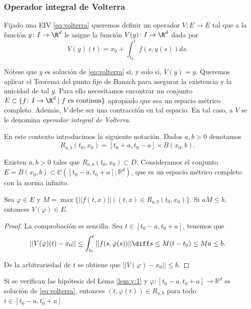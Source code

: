 \documentclass{article}
\begin{document}
\subsubsection{Operador integral de Volterra} \label{sec:eu:pl:volterra}

Fijado una EIV \eqref{eq:volterra} queremos definir un operador $V \colon E \to E$ tal que a la
función $y\colon I \to \R^d$ le asigne la función $V(y)\colon I \to \R^d$ dada por
\begin{equation}
  \label{eq:1}
  V(y)(t) = x_0 + \displaystyle\int_{t_0}^t f(s,y(s))ds.
\end{equation}

Nótese que $y$ es solución de \eqref{eq:volterra} si, y solo si, $V(y) = y$. Queremos aplicar el
Teorema del punto fijo de Banach para asegurar la existencia y la unicidad de tal $y$. Para ello
necesitamos encontrar un conjunto $E \subset \{f\colon I\to\R^d \mid f \text{ es continua}\}$
apropiado que sea un espacio métrico completo. Además, $V$ debe ser una contracción en tal
espacio. En tal caso, a $V$ se le denomina \emph{operador integral de Volterra}.

En este contexto introducimos la siguiente notación. Dados $a,b > 0$ denotamos
\[R_{a,b}(t_0, x_0) = [t_0+a, t_0-a] \times \overline{B}(x_0, b).\]

Existen $a,b > 0$ tales que $R_{a,b}(t_0,x_0) \subset D$.  Consideramos el conjunto
$E = \overline{B}(x_0, b) \subset \mathcal{C}([t_0-a, t_0+a]; \mathbb{R}^d)$, que es un espacio
métrico completo con la norma infinito.

\begin{lemma} \label{lem:v:1} Sea $\varphi \in E$ y
  $M = \max \{||f(t,x)|| \mid (t,x) \in R_{a,b}(t_0, x_0)\}$. Si $aM \le b$, entonces
  $V(\varphi) \in E$.
\end{lemma}
\begin{proof}
  La comprobación es sencilla. Sea $t \in [t_0-a, t_0+a]$, tenemos que
  \[ ||V(\varphi)(t)-x_0|| \le \int_{t_0}^t ||f(s, \varphi(s))|| \diff s \le M(t-t_0) \le M a \le
    b.  \]

  De la arbitrariedad de $t$ se obtiene que $||V(\varphi)-x_0|| \le b$.
\end{proof}

\begin{remark}
  Si se verifican las hipótesis del Lema \ref{lem:v:1} y $\varphi \colon [t_0-a, t_0+a] \to \mathbb{R}^d$
  es solución de \eqref{eq:volterra}, entonces $(t, \varphi(t)) \in R_{a,b}$ para todo
  $t \in [t_0-a, t_0+a]$.
\end{remark}
\end{document}
